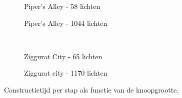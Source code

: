 \begin{figure}[t]
\begin{adjustbox}{minipage=\textwidth, scale=0.55}
    \begin{subfigure}[b]{0.8\textwidth}
      \centering
      \def\svgwidth{\textwidth}
      
      \caption{Piper's Alley - 58 lichten}
      \label{fig:hs-layered-exec:alley-58}
    \end{subfigure}
  \end{adjustbox}
  \begin{adjustbox}{minipage=\textwidth, scale=0.55}
    \begin{subfigure}[b]{0.8\textwidth}
      \centering
      \def\svgwidth{\textwidth}
      
      \caption{Piper's Alley - 1044 lichten}
      \label{fig:hs-layered-exec:alley-1044}
    \end{subfigure}
  \end{adjustbox} \\
  \begin{adjustbox}{minipage=\textwidth, scale=0.55}
    \begin{subfigure}[b]{0.8\textwidth}
      \centering
      \def\svgwidth{\textwidth}
      
      \caption{Ziggurat City - 65 lichten}
      \label{fig:hs-layered-exec:city-65}
    \end{subfigure}
  \end{adjustbox} %
  \begin{adjustbox}{minipage=\textwidth, scale=0.55}
    \begin{subfigure}[b]{0.8\textwidth}
      \centering
      \def\svgwidth{\textwidth}
      
      \caption{Ziggurat city - 1170 lichten}
      \label{fig:hs-layered-exec:city-1170}
    \end{subfigure}
  \end{adjustbox}
  \caption{\small Constructietijd per stap als functie van de knoopgrootte.}
  \label{fig:hs-layered-exec}
\end{figure}
